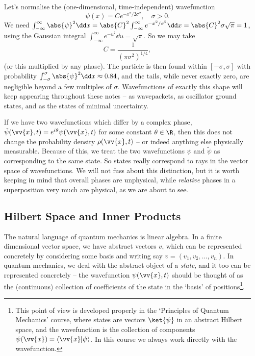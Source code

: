 \begin{example}
    Let's normalise the (one-dimensional, time-independent) wavefunction
    $$
    \psi(x) = C e^{-x^2 / 2 \sigma^2}, \quad \sigma > 0.
    $$
    We need $\int_{-\infty}^{\infty} \abs{\psi}^2 \dd x = \abs{C}^2 \int_{-\infty}^{\infty} e^{-x^2/\sigma^2} \dd x = \abs{C}^2 \sigma \sqrt{\pi} = 1$, using the Gaussian integral $\int_{-\infty}^\infty e^{-u^2} \dd u = \sqrt{\pi}$. So we may take
    $$
    C = \frac{1}{(\pi \sigma^2)^{1/4}},
    $$
    (or this multiplied by any phase). The particle is then found within $[-\sigma, \sigma]$ with probability $\int_{-\sigma}^{\sigma} \abs{\psi}^2 \dd x \approx 0.84$, and the tails, while never exactly zero, are negligible beyond a few multiples of $\sigma$. Wavefunctions of exactly this shape will keep appearing throughout these notes -- as wavepackets, as oscillator ground states, and as the states of minimal uncertainty.
\end{example}

\begin{remark}
    If we have two wavefunctions which differ by a complex phase, $\tilde{\psi}(\vv{x}, t) = e^{i \theta} \psi(\vv{x}, t)$ for some constant $\theta \in \R$, then this does not change the probability density $\rho(\vv{x}, t)$ -- or indeed anything else physically measurable. Because of this, we treat the two wavefunctions $\psi$ and $\tilde{\psi}$ as corresponding to the same state. So states really correspond to rays in the vector space of wavefunctions. We will not fuss about this distinction, but it is worth keeping in mind that overall phases are unphysical, while \emph{relative} phases in a superposition very much are physical, as we are about to see.
\end{remark}

\subsection{Hilbert Space and Inner Products}

The natural language of quantum mechanics is linear algebra. In a finite dimensional vector space, we have abstract vectors $v$, which can be represented concretely by considering some basis and writing say $v = (v_1, v_2, \dots, v_n)$. In quantum mechanics, we deal with the abstract object of a \emph{state}, and it too can be represented concretely -- the wavefunction $\psi(\vv{x}, t)$ should be thought of as the (continuous) collection of coefficients of the state in the `basis' of positions\footnote{This point of view is developed properly in the `Principles of Quantum Mechanics' course, where states are vectors $\ket{\psi}$ in an abstract Hilbert space, and the wavefunction is the collection of components $\psi(\vv{x}) = \langle \vv{x} | \psi \rangle$. In this course we always work directly with the wavefunction.}.

